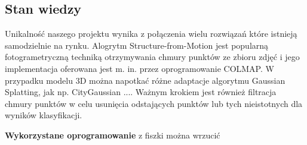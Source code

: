 \subsection{Stan wiedzy}

Unikalność naszego projektu wynika z połączenia wielu rozwiązań które istnieją samodzielnie na rynku. Alogrytm Structure-from-Motion jest popularną fotogrametryczną techniką otrzymywania chmury punktów ze zbioru zdjęć i jego implementacja oferowana jest m. in. przez oprogramowanie COLMAP. W przypadku modelu 3D można napotkać różne adaptacje algorytmu Gaussian Splatting, jak np. CityGaussian .... Ważnym krokiem jest również filtracja chmury punktów w celu usunięcia odstających punktów lub tych nieistotnych dla wyników klasyfikacji.  

\textbf{Wykorzystane oprogramowanie}
z fiszki można wrzucić 